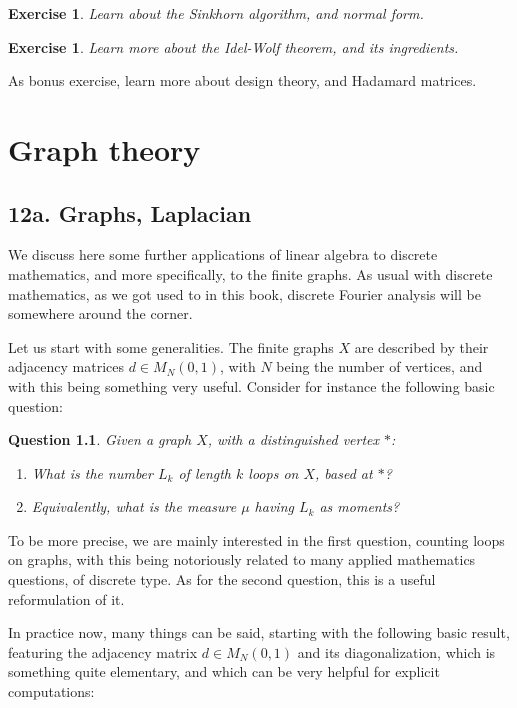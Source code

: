 \documentclass[12pt]{amsbook}
\newtheorem{exercise}[theorem]{Exercise}
\newtheorem{question}[theorem]{Question}
\begin{document}
\begin{exercise}
Learn about the Sinkhorn algorithm, and normal form.
\end{exercise}

\begin{exercise}
Learn more about the Idel-Wolf theorem, and its ingredients.
\end{exercise}

As bonus exercise, learn more about design theory, and Hadamard matrices.

\chapter{Graph theory}

\section*{12a. Graphs, Laplacian}

We discuss here some further applications of linear algebra to discrete mathematics, and more specifically, to the finite graphs. As usual with discrete mathematics, as we got used to in this book, discrete Fourier analysis will be somewhere around the corner. 

\bigskip

Let us start with some generalities. The finite graphs $X$ are described by their adjacency matrices $d\in M_N(0,1)$, with $N$ being the number of vertices, and with this being something very useful. Consider for instance the following basic question:

\begin{question}
Given a graph $X$, with a distinguished vertex $*$:
\begin{enumerate}
\item What is the number $L_k$ of length $k$ loops on $X$, based at $*$? 

\item Equivalently, what is the measure $\mu$ having $L_k$ as moments?
\end{enumerate}
\end{question}

To be more precise, we are mainly interested in the first question, counting loops on graphs, with this being notoriously related to many applied mathematics questions, of discrete type. As for the second question, this is a useful reformulation of it.

\bigskip

In practice now, many things can be said, starting with the following basic result, featuring the adjacency matrix $d\in M_N(0,1)$ and its diagonalization, which is something quite elementary, and which can be very helpful for explicit computations:
\end{document}
